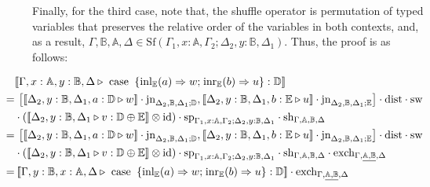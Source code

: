 Finally, for the third case, note that, the shuffle operator is permutation of typed variables that preserves the relative order of the variables in both contexts, and, as a result, $\Gamma,\mathbb{B},\mathbb{A}, \Delta \in  \text{Sf}(\Gamma_{1}, x:\mathbb{A},\Gamma_{2}; \Delta_{2},y:\mathbb{B},\Delta_{1})$. Thus, the proof is as follows:

\begin{equation*}
  \hspace{-30pt}
  \begin{split}
    & [\![\Gamma,x:\mathbb{A}, y:\mathbb{B}, \Delta \triangleright \text{ case }  \hspace{2pt}  \{\text{inl}_{\mathbb{E}} (a) \Rightarrow w ; \hspace{1pt} \text{inr}_{\mathbb{E}} (b) \Rightarrow u\}: \mathbb{D}]\!] \\
     =  &\hspace{2pt}  \left[[\![ \Delta_{2},y:\mathbb{B},\Delta_{1}, a:\mathbb{D} \triangleright w ]\!] \cdot \text{jn}_{\Delta_{2},\mathbb{B},\Delta_{1};\mathbb{D}},[\![  \Delta_{2},y:\mathbb{B},\Delta_{1}, b:\mathbb{E} \triangleright u ]\!] \cdot \text{jn}_{\Delta_{2},\mathbb{B},\Delta_{1};\mathbb{E}}\right]\cdot \text{dist} \cdot \text{sw}  \\
     &\cdot ([\![\Delta_{2},y:\mathbb{B},\Delta_{1} \triangleright v : \mathbb{D} \oplus \mathbb{E}  ]\!] \otimes \text{id}) \cdot\text{sp}_{\Gamma_{1}, x:\mathbb{A},\Gamma_{2}; \Delta_{2},y:\mathbb{B},\Delta_{1}} \cdot \text{sh}_{\Gamma,\mathbb{A}, \mathbb{B},\Delta} \\
     = & \hspace{2pt}  \left[[\![ \Delta_{2},y:\mathbb{B},\Delta_{1}, a:\mathbb{D} \triangleright w ]\!] \cdot \text{jn}_{\Delta_{2},\mathbb{B},\Delta_{1};\mathbb{D}},[\![  \Delta_{2},y:\mathbb{B},\Delta_{1}, b:\mathbb{E} \triangleright u ]\!] \cdot \text{jn}_{\Delta_{2},\mathbb{B},\Delta_{1};\mathbb{E}}\right]\cdot \text{dist} \cdot \text{sw}  \\
     & \cdot ([\![\Delta_{2},y:\mathbb{B},\Delta_{1} \triangleright v : \mathbb{D} \oplus \mathbb{E}  ]\!] \otimes \text{id}) \cdot \text{sp}_{\Gamma_{1}, x:\mathbb{A},\Gamma_{2}; \Delta_{2},y:\mathbb{B},\Delta_{1}} \cdot \text{sh}_{\Gamma,\mathbb{A}, \mathbb{B},\Delta} \cdot \text{exch}_{\Gamma, \underline{ \mathbb{A}, \mathbb{B}}, \Delta} \\
      = & \hspace{2pt} [\![\Gamma,y:\mathbb{B}, x:\mathbb{A}, \Delta \triangleright \text{ case }  \hspace{2pt}  \{\text{inl}_{\mathbb{E}} (a) \Rightarrow w ; \hspace{1pt} \text{inr}_{\mathbb{E}} (b) \Rightarrow u\}: \mathbb{D}]\!] \cdot \text{exch}_{\Gamma,\underline{\mathbb{A},  \mathbb{B}}, \Delta} 
\end{split}
\end{equation*}



